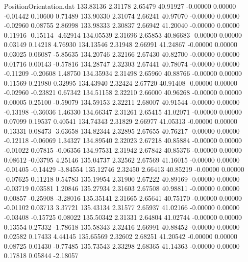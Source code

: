 \begin{filecontents}{PositionOrientation.dat}
 133.83136    2.31178    2.65479    40.91927   -0.00000    0.00000   -0.01442    0.10600    0.71489
 133.90330    2.31074    2.66241    40.97070   -0.00000    0.00000   -0.02960    0.08755    2.86998
 133.98333    2.30837    2.66942    41.20040   -0.00000    0.00000    0.11916   -0.15114   -4.62914
 134.05539    2.31696    2.65853    40.86683   -0.00000    0.00000    0.03149    0.14218    4.76930
 134.13546    2.31948    2.66991    41.24867   -0.00000    0.00000    0.03025    0.06087   -5.85635
 134.20746    2.32166    2.67430    40.82700   -0.00000    0.00000    0.01716    0.00143   -0.57816
 134.28747    2.32303    2.67441    40.78074   -0.00000    0.00000   -0.11209   -0.20608    1.48750
 134.35934    2.31498    2.65960    40.88766   -0.00000    0.00000    0.11569    0.21980    0.32995
 134.43940    2.32424    2.67720    40.91408   -0.00000    0.00000   -0.02960   -0.23821    0.67342
 134.51158    2.32210    2.66000    40.96268   -0.00000    0.00000    0.00005    0.25100   -0.59079
 134.59153    2.32211    2.68007    40.91544   -0.00000    0.00000   -0.13198   -0.36036    1.46330
 134.66347    2.31261    2.65415    41.02071   -0.00000    0.00000    0.07099    0.19537    0.40541
 134.74343    2.31829    2.66977    41.05313   -0.00000    0.00000    0.13331    0.08473   -3.63658
 134.82344    2.32895    2.67655    40.76217   -0.00000    0.00000   -0.12118   -0.06069    1.34327
 134.89540    2.32023    2.67218    40.85884   -0.00000    0.00000   -0.01022    0.07815   -0.06356
 134.97531    2.31942    2.67842    40.85376   -0.00000    0.00000    0.08612   -0.03795    4.25146
 135.04737    2.32562    2.67569    41.16015   -0.00000    0.00000   -0.01405   -0.14429   -3.84554
 135.12746    2.32450    2.66413    40.85219   -0.00000    0.00000   -0.07625    0.11218    0.54783
 135.19954    2.31900    2.67222    40.89169   -0.00000    0.00000   -0.03719    0.03581    1.20846
 135.27934    2.31603    2.67508    40.98811   -0.00000    0.00000    0.00857   -0.25908   -3.28016
 135.35141    2.31665    2.65641    40.75170   -0.00000    0.00000   -0.01102    0.03713    3.37721
 135.43134    2.31577    2.65937    41.02166   -0.00000    0.00000   -0.03408   -0.15725    0.08022
 135.50342    2.31331    2.64804    41.02744   -0.00000    0.00000    0.13554    0.27332   -1.78618
 135.58343    2.32416    2.66991    40.88452   -0.00000    0.00000    0.02582    0.17433    4.44145
 135.65569    2.32602    2.68251    41.20542   -0.00000    0.00000    0.08725    0.01430   -0.77485
 135.73543    2.33298    2.68365    41.14363   -0.00000    0.00000    0.17818    0.05844   -2.18057

\end{filecontents}
